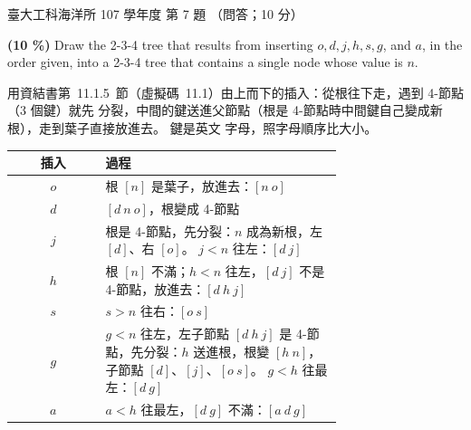 \begin{pastexam}[label={px:ntu-107-esoe-ds-07}]{臺大工科海洋所 107 學年度 第 7 題}
（問答；10 分）

\textbf{(10 \%)} Draw the 2-3-4 tree that results from inserting $o, d, j, h, s, g$, and $a$, in the
order given, into a 2-3-4 tree that contains a single node whose value is $n$.
\end{pastexam}

\begin{pastsoln}
用資結書第~11.1.5~節（虛擬碼~11.1）由上而下的插入：從根往下走，遇到 4-節點（$3$ 個鍵）就先
分裂，中間的鍵送進父節點（根是 4-節點時中間鍵自己變成新根），走到葉子直接放進去。 鍵是英文
字母，照字母順序比大小。

\begin{center}
\small
\begin{tabular}{cp{0.72\linewidth}}
\toprule
插入 & 過程 \\
\midrule
$o$ & 根 $[n]$ 是葉子，放進去：$[n\ o]$ \\
$d$ & $[d\ n\ o]$，根變成 4-節點 \\
$j$ & 根是 4-節點，先分裂：$n$ 成為新根，左 $[d]$、右 $[o]$。 $j < n$ 往左：$[d\ j]$ \\
$h$ & 根 $[n]$ 不滿；$h < n$ 往左，$[d\ j]$ 不是 4-節點，放進去：$[d\ h\ j]$ \\
$s$ & $s > n$ 往右：$[o\ s]$ \\
$g$ & $g < n$ 往左，左子節點 $[d\ h\ j]$ 是 4-節點，先分裂：$h$ 送進根，根變 $[h\ n]$，子節點
$[d]$、$[j]$、$[o\ s]$。 $g < h$ 往最左：$[d\ g]$ \\
$a$ & $a < h$ 往最左，$[d\ g]$ 不滿：$[a\ d\ g]$ \\
\bottomrule
\end{tabular}
\end{center}


\end{pastsoln}
